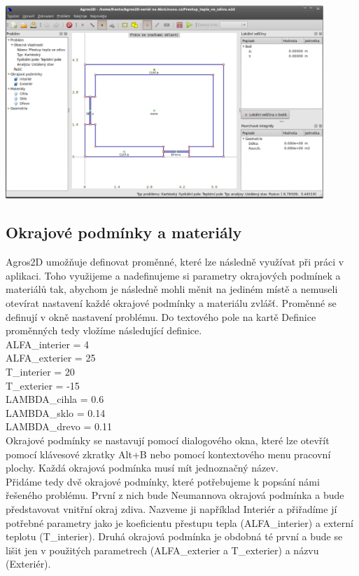 \documentclass[a4paper, oneside]{article}
\begin{document}
\includegraphics[width=12cm]{geometrie_bez_izolace.eps}\\
\subsection{Okrajové podmínky a materiály}
Agros2D umožňuje definovat proměnné, které lze následně využívat při práci v aplikaci. Toho využijeme a nadefinujeme si parametry okrajových podmínek a materiálů tak, abychom je následně mohli měnit na jediném místě a nemuseli otevírat nastavení každé okrajové podmínky a materiálu zvlášť. Proměnné se definují v okně nastavení problému. Do textového pole na kartě Definice proměnných tedy vložíme následující definice.\\
ALFA\_interier = 4\\
ALFA\_exterier = 25\\
T\_interier = 20\\
T\_exterier = -15\\
LAMBDA\_cihla = 0.6\\
LAMBDA\_sklo = 0.14\\
LAMBDA\_drevo = 0.11\\
Okrajové podmínky se nastavují pomocí dialogového okna, které lze otevřít pomocí klávesové zkratky Alt+B nebo pomocí kontextového menu pracovní plochy. Každá okrajová podmínka musí mít jednoznačný název.\\
Přidáme tedy dvě okrajové podmínky, které potřebujeme k popsání námi řešeného problému. První z nich bude Neumannova okrajová podmínka a bude představovat vnitřní okraj zdiva. Nazveme ji například Interiér a přiřadíme jí potřebné parametry jako je koeficientu přestupu tepla (ALFA\_interier) a externí teplotu (T\_interier). Druhá okrajová podmínka je obdobná té první a bude se lišit jen v použitých parametrech (ALFA\_exterier a T\_exterier) a názvu (Exteriér).\\
\end{document}
